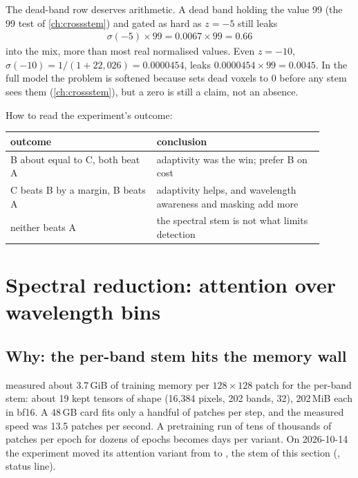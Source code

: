 The dead-band row deserves arithmetic. A dead band holding the value 99 (the 99 test of \cref{ch:crossstem}) and gated as hard as $z = -5$ still leaks
\begin{align*}
  \sigma(-5)\times99 = 0.0067\times99 = 0.66
\end{align*}
into the mix, more than most real normalised values. Even $z = -10$, $\sigma(-10) = 1/(1 + 22{,}026) = 0.0000454$, leaks $0.0000454\times99 = 0.0045$. In the full model the problem is softened because  sets dead voxels to 0 before any stem sees them (\cref{ch:crossstem}), but a zero is still a claim, not an absence.

How to read the experiment's outcome:
\begin{center}
\begin{tabular}{p{0.42\linewidth}p{0.48\linewidth}}\toprule
outcome & conclusion\\\midrule
B about equal to C, both beat A & adaptivity was the win; prefer B on cost\\
C beats B by a margin, B beats A & adaptivity helps, and wavelength awareness and masking add more\\
neither beats A & the spectral stem is not what limits detection\\\bottomrule
\end{tabular}
\end{center}

\section{Spectral reduction: attention over wavelength bins}\label{sec:specdecoder:reduced}

\subsection{Why: the per-band stem hits the memory wall}

{\sloppy{} measured about 3.7\,GiB of training memory per $128\times128$ patch for the per-band stem: about 19 kept tensors of shape (16,384 pixels, 202 bands, 32), 202\,MiB each in bf16. A 48\,GB card fits only a handful of patches per step, and the measured speed was 13.5 patches per second. A pretraining run of tens of thousands of patches per epoch for dozens of epochs becomes days per variant. On 2026-10-14 the experiment moved its attention variant from  to , the stem of this section (, status line).\par}

